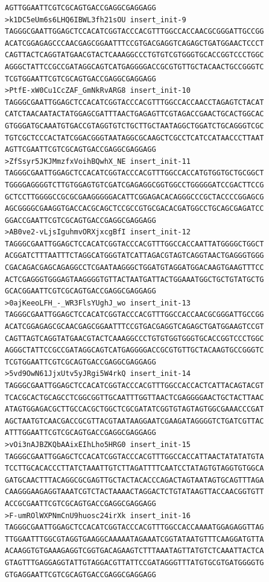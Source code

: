 \documentclass[11pt]{article}
\begin{document}
\begin{verbatim}
AGTTGGAATTCGTCGCAGTGACCGAGGCGAGGAGG
>k1DC5eUm6s6LHQ6IBWL3fh21sOU insert_init-9
TAGGGCGAATTGGAGCTCCACATCGGTACCCACGTTTGGCCACCAACGCGGGATTGCCGG
ACATCGGAGAGCCCAACGAGCGGAATTTCCGTGACGAGGTCAGAGCTGATGGAACTCCCT
CAGTTACTCAGGTATGAACGTACTCAAAGGCCCTGTGTCGTGGGTGCACCGGTCCCTGGC
AGGGCTATTCCGCCGATAGGCAGTCATGAGGGGACCGCGTGTTGCTACAACTGCCGGGTC
TCGTGGAATTCGTCGCAGTGACCGAGGCGAGGAGG
>PtfE-xW0Cu1CcZAF_GmNkRvARG8 insert_init-10
TAGGGCGAATTGGAGCTCCACATCGGTACCCACGTTTGGCCACCAACCTAGAGTCTACAT
CATCTAACAATACTATGGAGCGATTTAACTGAGAGTTCGTAGACCGAACTGCACTGGCAC
GTGGGATGCAAATGTGACCGTAGGTGTCTGCTTGCTAATAGGCTGGATCTGCAGGGTCGC
TGTCGCTCCCACTATCGGACGGGTAATAGGCGCAAGCTCGCCTCATCCATAACCCTTAAT
AGTTCGAATTCGTCGCAGTGACCGAGGCGAGGAGG
>ZfSsyr5JKJMmzfxVoihBQwhX_NE insert_init-11
TAGGGCGAATTGGAGCTCCACATCGGTACCCACGTTTGGCCACCATGTGGTGCTGCGGCT
TGGGGAGGGGTCTTGTGGAGTGTCGATCGAGAGGCGGTGGCCTGGGGGATCCGACTTCCG
GCTCCTTGGGGCCGCGCGAAGGGGGACATTCGGAGACACAGGGCCCGCTACCCCGGAGCG
AGCGGGGCGAAGGTGACCACGCAGCTCCGCCGTGCGACACGATGGCCTGCAGCGAGATCC
GGACCGAATTCGTCGCAGTGACCGAGGCGAGGAGG
>AB0ve2-vLjsIguhmvORXjxcgBfI insert_init-12
TAGGGCGAATTGGAGCTCCACATCGGTACCCACGTTTGGCCACCAATTATGGGGCTGGCT
ACGGATCTTTAATTTCTAGGCATGGGTATCATTAGACGTAGTCAGGTAACTGAGGGTGGG
CGACAGACGAGCAGAGGCCTCGAATAAGGGCTGGATGTAGGATGGACAAGTGAAGTTTCC
ACTCGAGGGTGGGAGTAAGGGGTGTTACTAATGATTACTGGAAATGGCTGCTGTATGCTG
GCACGGAATTCGTCGCAGTGACCGAGGCGAGGAGG
>0ajKeeoLFH_-_WR3FlsYUghJ_wo insert_init-13
TAGGGCGAATTGGAGCTCCACATCGGTACCCACGTTTGGCCACCAACGCGGGATTGCCGG
ACATCGGAGAGCGCAACGAGCGGAATTTCCGTGACGAGGTCAGAGCTGATGGAAGTCCGT
CAGTTAGTCAGGTATGAACGTACTCAAAGGCCCTGTGTGGTGGGTGCACCGGTCCCTGGC
AGGGCTATTCCGCCGATAGGCAGTCATGAGGGGACCGCGTGTTGCTACAAGTGCCGGGTC
TCGTGGAATTCGTCGCAGTGACCGAGGCGAGGAGG
>5vd9OwN61JjxUtv5yJRgi5W4rkQ insert_init-14
TAGGGCGAATTGGAGCTCCACATCGGTACCCACGTTTGGCCACCACTCATTACAGTACGT
TCACGCACTGCAGCCTCGGCGGTTGCAATTTGGTTAACTCGAGGGGAACTGCTACTTAAC
ATAGTGGAGACGCTTGCCACGCTGGCTCGCGATATCGGTGTAGTAGTGGCGAAACCCGAT
AGCTAATGTCAACGACCGCGTTACGTAATAAGGAATCGAAGATAGGGGTCTGATCGTTAC
ATTTGGAATTCGTCGCAGTGACCGAGGCGAGGAGG
>vOi3nAJBZKQbAAixEIhLho5HRG0 insert_init-15
TAGGGCGAATTGGAGCTCCACATCGGTACCCACGTTTGGCCACCATTAACTATATATGTA
TCCTTGCACACCCTTATCTAAATTGTCTTAGATTTTCAATCCTATAGTGTAGGTGTGGCA
GATGCAACTTTACAGGCGCGAGTTGCTACTACACCCAGACTAGTAATAGTGCAGTTTAGA
CAAGGGAAGAGGTAAATCGTCTACTAAAACTAGGACTCTGTATAAGTTACCAACGGTGTT
ACCGCGAATTCGTCGCAGTGACCGAGGCGAGGAGG
>F-umROlWXPNmCnU9huosc24irXk insert_init-16
TAGGGCGAATTGGAGCTCCACATCGGTACCCACGTTTGGCCACCAAAATGGAGAGGTTAG
TTGGAATTTGGCGTAGGTGAAGGCAAAAATAGAAATCGGTATAATGTTTCAAGGATGTTA
ACAAGGTGTGAAAGAGGTCGGTGACAGAAGTCTTTAAATAGTTATGTCTCAAATTACTCA
GTAGTTTGAGGAGGTATTGTAGGACGTTATTCCGATAGGGTTTATGTGCGTGATGGGGTG
GTGAGGAATTCGTCGCAGTGACCGAGGCGAGGAGG

\end{verbatim}
\end{document}
